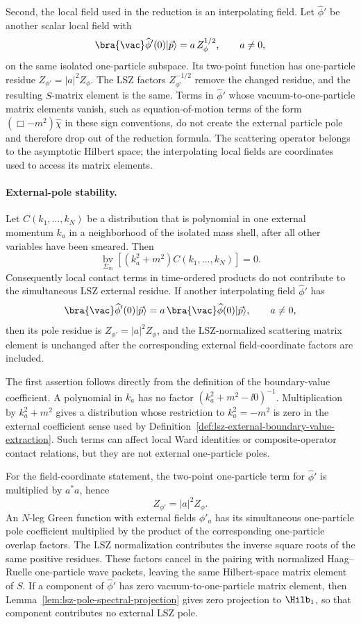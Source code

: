 Second, the local field used in the reduction is an interpolating field.  Let
\(\widehat\phi'\) be another scalar local field with
\[
  \bra{\vac}\widehat\phi'(0)|\vec p\rangle
  =
  a\,Z_\phi^{1/2},
  \qquad a\ne0,
\]
on the same isolated one-particle subspace.  Its two-point function has
one-particle residue \(Z_{\phi'}=|a|^2Z_\phi\).  The LSZ factors
\(Z_{\phi'}^{-1/2}\) remove the
changed residue, and the resulting \(S\)-matrix element is the same.  Terms in
\(\widehat\phi'\) whose vacuum-to-one-particle matrix elements vanish, such
as equation-of-motion terms of the form \((\Box-m^2)\widehat\chi\) in these
sign conventions, do not create the external particle pole and therefore drop
out of the reduction formula.  The scattering operator belongs to the
asymptotic Hilbert space; the interpolating local fields are coordinates used
to access its matrix elements.

\paragraph{External-pole stability.}
Let \(C(k_1,\ldots,k_N)\) be a distribution that is polynomial in one
external momentum \(k_a\) in a neighborhood of the isolated mass shell, after
all other variables have been smeared.  Then
\[
  \operatorname*{bv}_{\Sigma_m}
  \left[
    (k_a^2+m^2)C(k_1,\ldots,k_N)
  \right]=0 .
\]
Consequently local contact terms in time-ordered products do not contribute
to the simultaneous LSZ external residue.  If another interpolating field
\(\widehat\phi'\) has
\[
  \bra{\vac}\widehat\phi'(0)|\vec p\rangle
  =
  a\,\bra{\vac}\widehat\phi(0)|\vec p\rangle,
  \qquad a\ne0,
\]
then its pole residue is \(Z_{\phi'}=|a|^2Z_\phi\), and the LSZ-normalized
scattering matrix element is unchanged after the corresponding external
field-coordinate factors are included.

The first assertion follows directly from the definition of the boundary-value
coefficient.  A polynomial in \(k_a\) has no factor
\((k_a^2+m^2-\ii0)^{-1}\).  Multiplication by \(k_a^2+m^2\) gives a
distribution whose restriction to \(k_a^2=-m^2\) is zero in the external
coefficient sense used by Definition~\ref{def:lsz-external-boundary-value-extraction}.
Such terms can affect local Ward identities or composite-operator contact
relations, but they are not external one-particle poles.

For the field-coordinate statement, the two-point one-particle term for
\(\widehat\phi'\) is multiplied by \(a^*a\), hence
\[
  Z_{\phi'}=|a|^2Z_\phi .
\]
An \(N\)-leg Green function with external fields \(\phi'_a\) has its
simultaneous one-particle pole coefficient multiplied by the product of the
corresponding one-particle overlap factors.  The LSZ normalization contributes
the inverse square roots of the same positive residues.  These factors cancel
in the pairing with normalized Haag--Ruelle one-particle wave packets, leaving
the same Hilbert-space matrix element of \(S\).  If a component of
\(\widehat\phi'\) has zero vacuum-to-one-particle matrix element, then
Lemma~\ref{lem:lsz-pole-spectral-projection} gives zero projection to
\(\Hilb_1\), so that component contributes no external LSZ pole.


